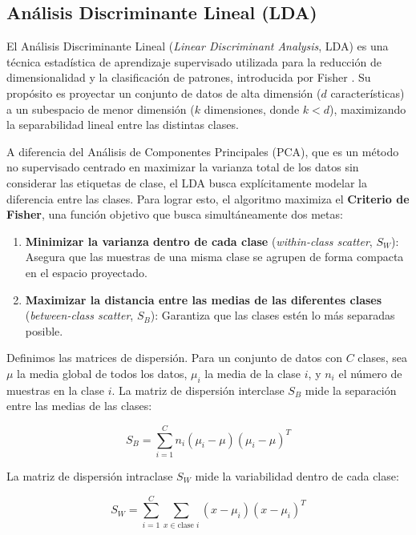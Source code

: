 \subsection{Análisis Discriminante Lineal (LDA)}

El Análisis Discriminante Lineal (\textit{Linear Discriminant Analysis}, LDA) es una técnica estadística de aprendizaje supervisado utilizada para la reducción de dimensionalidad y la clasificación de patrones, introducida por Fisher \cite{fisher1936use}. Su propósito es proyectar un conjunto de datos de alta dimensión ($d$ características) a un subespacio de menor dimensión ($k$ dimensiones, donde $k < d$), maximizando la separabilidad lineal entre las distintas clases.

A diferencia del Análisis de Componentes Principales (PCA), que es un método no supervisado centrado en maximizar la varianza total de los datos sin considerar las etiquetas de clase, el LDA busca explícitamente modelar la diferencia entre las clases. Para lograr esto, el algoritmo maximiza el \textbf{Criterio de Fisher}, una función objetivo que busca simultáneamente dos metas:

\begin{enumerate}
	\item \textbf{Minimizar la varianza dentro de cada clase} (\textit{within-class scatter}, $S_W$): Asegura que las muestras de una misma clase se agrupen de forma compacta en el espacio proyectado.
	
	\item \textbf{Maximizar la distancia entre las medias de las diferentes clases} (\textit{between-class scatter}, $S_B$): Garantiza que las clases estén lo más separadas posible.
\end{enumerate}

Definimos las matrices de dispersión. Para un conjunto de datos con $C$ clases, sea $\mu$ la media global de todos los datos, $\mu_i$ la media de la clase $i$, y $n_i$ el número de muestras en la clase $i$. La matriz de dispersión interclase $S_B$ mide la separación entre las medias de las clases:

\begin{equation}
	S_B = \sum_{i=1}^{C} n_i (\mu_i - \mu)(\mu_i - \mu)^T \tag{9}
\end{equation}

La matriz de dispersión intraclase $S_W$ mide la variabilidad dentro de cada clase:

\begin{equation}
	S_W = \sum_{i=1}^{C} \sum_{x \in \text{clase } i} (x - \mu_i)(x - \mu_i)^T \tag{10}
\end{equation}

